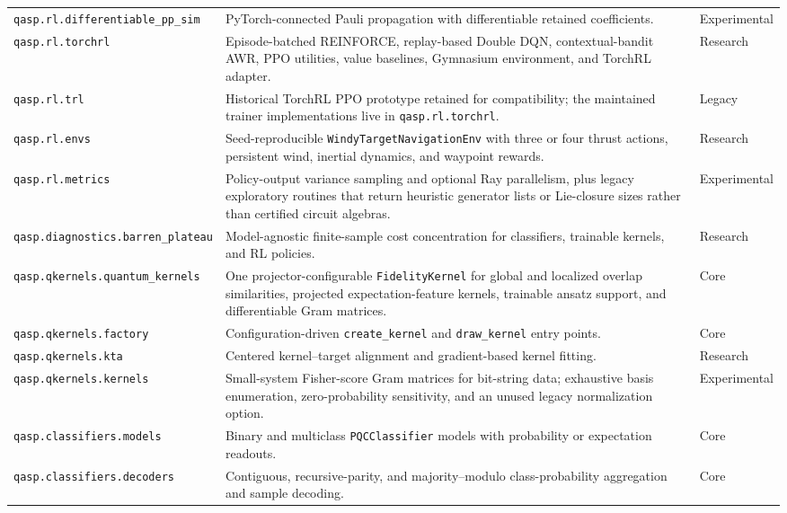 \documentclass[10pt]{article}
\newcommand{\code}[1]{\texttt{#1}}
\begin{document}
\begin{table}[p]
\begin{tabularx}{\textwidth}{@{}p{}X>{\raggedright\arraybackslash}p{}@{}}
\code{qasp.rl.}\linebreak\code{differentiable\_pp\_sim} & PyTorch-connected Pauli propagation with differentiable retained coefficients. & Experimental \\
\code{qasp.rl.torchrl} & Episode-batched REINFORCE, replay-based Double DQN, contextual-bandit AWR, PPO utilities, value baselines, Gymnasium environment, and TorchRL adapter. & Research \\
\code{qasp.rl.trl} & Historical TorchRL PPO prototype retained for compatibility; the maintained trainer implementations live in \code{qasp.rl.torchrl}. & Legacy \\
\code{qasp.rl.envs} & Seed-reproducible \code{WindyTargetNavigationEnv} with three or four thrust actions, persistent wind, inertial dynamics, and waypoint rewards. & Research \\
\code{qasp.rl.metrics} & Policy-output variance sampling and optional Ray parallelism, plus legacy exploratory routines that return heuristic generator lists or Lie-closure sizes rather than certified circuit algebras. & Experimental \\
\code{qasp.diagnostics.}\linebreak\code{barren\_plateau} & Model-agnostic finite-sample cost concentration for classifiers, trainable kernels, and RL policies. & Research \\
\code{qasp.qkernels.}\linebreak\code{quantum\_kernels} & One projector-configurable \code{FidelityKernel} for global and localized overlap similarities, projected expectation-feature kernels, trainable ansatz support, and differentiable Gram matrices. & Core \\
\code{qasp.qkernels.factory} & Configuration-driven \code{create\_kernel} and \code{draw\_kernel} entry points. & Core \\
\code{qasp.qkernels.kta} & Centered kernel--target alignment and gradient-based kernel fitting. & Research \\
\code{qasp.qkernels.kernels} & Small-system Fisher-score Gram matrices for bit-string data; exhaustive basis enumeration, zero-probability sensitivity, and an unused legacy normalization option. & Experimental \\
\code{qasp.classifiers.models} & Binary and multiclass \code{PQCClassifier} models with probability or expectation readouts. & Core \\
\code{qasp.classifiers.decoders} & Contiguous, recursive-parity, and majority--modulo class-probability aggregation and sample decoding. & Core \\

\end{tabularx}
\end{table}
\end{document}
